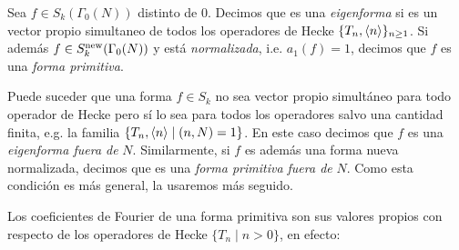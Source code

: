 \documentclass[../../tesis_maestria]{subfiles}
\begin{document}
\begin{defin}\label{def:formaprimitiva}
  Sea $f\in S_k(\Gamma_0(N))$ distinto de 0. Decimos que es una \emph{eigenforma} si es un vector
  propio simultaneo de todos los operadores de Hecke $\{T_n,\langle n \rangle\}_{n\geq1}$. Si adem\'as
  $f\in S_k^{\mathrm{new}}(\Gamma_0(N))$ y est\'a \emph{normalizada}, i.e. $a_1(f)=1$, decimos que $f$ es una
  \emph{forma primitiva}.
\end{defin}

\begin{nota}
  Puede suceder que una forma $f\in S_k$ no sea vector propio simultáneo para todo operador de Hecke pero s\'i lo sea para todos los operadores salvo una cantidad finita, e.g. la familia  $\{T_n,\langle n \rangle\mid (n,N)=1\}$. En
  este caso decimos que $f$ es una \emph{eigenforma fuera de} $N$. Similarmente, si $f$ es adem\'as una
  forma nueva normalizada, decimos que es una \emph{forma primitiva fuera de} $N$. Como esta condición es más general, la usaremos más seguido.
\end{nota}

Los coeficientes de Fourier de una forma primitiva son sus valores propios con respecto de los operadores de Hecke $\{T_n\mid n>0\}$, en efecto:
\end{document}
